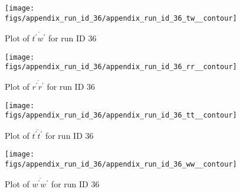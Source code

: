 \begin{figure}[H]
\centering
\texttt{[image: figs/appendix\_run\_id\_36/appendix\_run\_id\_36\_tw\_\_contour]}
\caption{Plot of $\overline{t^\prime w^\prime}$ for run ID 36}
\label{fig:appendix_run_id_36_tw__contour}
\end{figure}


\begin{figure}[H]
\centering
\texttt{[image: figs/appendix\_run\_id\_36/appendix\_run\_id\_36\_rr\_\_contour]}
\caption{Plot of $\overline{r^\prime r^\prime}$ for run ID 36}
\label{fig:appendix_run_id_36_rr__contour}
\end{figure}


\begin{figure}[H]
\centering
\texttt{[image: figs/appendix\_run\_id\_36/appendix\_run\_id\_36\_tt\_\_contour]}
\caption{Plot of $\overline{t^\prime t^\prime}$ for run ID 36}
\label{fig:appendix_run_id_36_tt__contour}
\end{figure}


\begin{figure}[H]
\centering
\texttt{[image: figs/appendix\_run\_id\_36/appendix\_run\_id\_36\_ww\_\_contour]}
\caption{Plot of $\overline{w^\prime w^\prime}$ for run ID 36}
\label{fig:appendix_run_id_36_ww__contour}
\end{figure}


